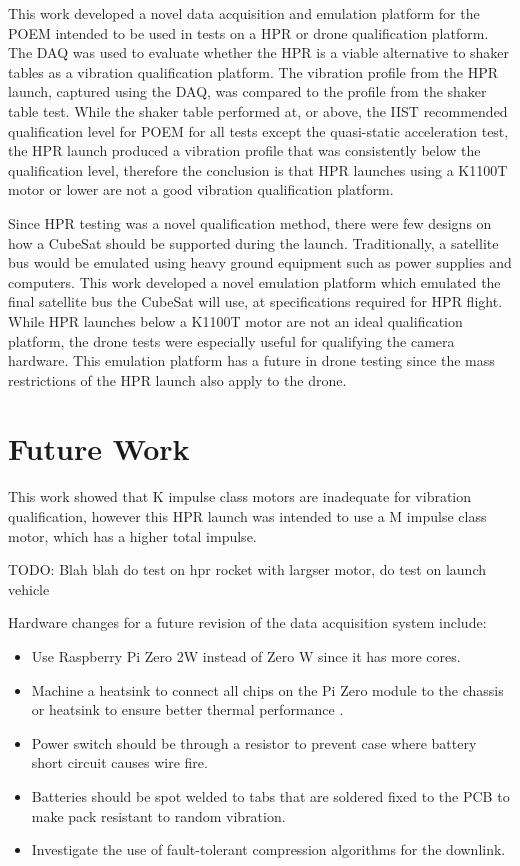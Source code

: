 \documentclass{report}
\begin{document}
This work developed a novel data acquisition and emulation platform for the POEM intended to be used in tests on a HPR or drone qualification platform. The DAQ was used to evaluate whether the HPR is a viable alternative to shaker tables as a vibration qualification platform. The vibration profile from the HPR launch, captured using the DAQ, was compared to the profile from the shaker table test. While the shaker table performed at, or above, the IIST recommended qualification level for POEM for all tests except the quasi-static acceleration test, the HPR launch produced a vibration profile that was consistently below the qualification level, therefore the conclusion is that HPR launches using a K1100T motor or lower are not a good vibration qualification platform.

Since HPR testing was a novel qualification method, there were few designs on how a CubeSat should be supported during the launch. Traditionally, a satellite bus would be emulated using heavy ground equipment such as power supplies and computers. This work developed a novel emulation platform which emulated the final satellite bus the CubeSat will use, at specifications required for HPR flight. While HPR launches below a K1100T motor are not an ideal qualification platform, the drone tests were especially useful for qualifying the camera hardware. This emulation platform has a future in drone testing since the mass restrictions of the HPR launch also apply to the drone.

\section{Future Work}

This work showed that K impulse class motors are inadequate for vibration qualification, however this HPR launch was intended to use a M impulse class motor, which has a higher total impulse.

TODO: Blah blah do test on hpr rocket with largser motor, do test on launch vehicle

Hardware changes for a future revision of the data acquisition system include:

\begin{itemize}
  \item Use Raspberry Pi Zero 2W instead of Zero W since it has more cores.
  \item Machine a heatsink to connect all chips on the Pi Zero module to the chassis or heatsink to ensure better thermal performance \cite{guertin2022raspberry}.
  \item Power switch should be through a resistor to prevent case where battery short circuit causes wire fire.
  \item Batteries should be spot welded to tabs that are soldered fixed to the PCB to make pack resistant to random vibration.
  \item Investigate the use of fault-tolerant compression algorithms for the downlink. %
\end{itemize}
\end{document}
